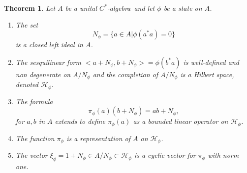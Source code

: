 \documentclass{book}
\newtheorem{theorem}[definition]{Theorem}
\def\cstar{\(C^*\)-algebra}
\begin{document}
\begin{theorem}\label{Petersen:333}
  Let \(A\) be a unital \cstar\ and let \(\phi\) be a state on \(A\).
\begin{enumerate}
  \item The set
    \[N_\phi =\{a\in A|\phi(a^*a) = 0\}\]
    is a closed left ideal in \(A\).
    \item The sesquilinear form \(< a+N_\phi,b+N_\phi >= \phi(b^*a)\) is well-defined and non
    degenerate on \(A/N_\phi\) and the completion of \(A/N_\phi\) is a Hilbert space,
    denoted \(\mathcal{H}_\phi\).
    \item The formula
    \[\pi_\phi(a)(b + N_\phi) = ab+N_\phi,\]
    for \(a,b\) in \(A\) extends to define \(\pi_\phi(a)\) as a bounded linear operator on
    \(\mathcal{H}_\phi\).
    \item The function \(\pi_\phi\) is a representation of \(A\) on \(\mathcal{H}_\phi\).
    \item The vector \(\xi_\phi = 1 + N_\phi \in A/N_\phi \subset \mathcal{H}_\phi\) is a cyclic vector for \(\pi_\phi\) with
    norm one.
\end{enumerate}
\end{theorem}
\end{document}
